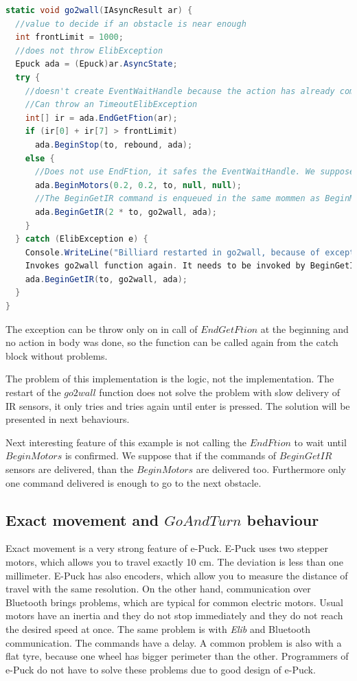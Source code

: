 \begin{lstlisting}[language=cs]
static void go2wall(IAsyncResult ar) {
  //value to decide if an obstacle is near enough
  int frontLimit = 1000;  
  //does not throw ElibException
  Epuck ada = (Epuck)ar.AsyncState;
  try {
    //doesn't create EventWaitHandle because the action has already completed synchronously.
    //Can throw an TimeoutElibException
    int[] ir = ada.EndGetFtion(ar);    
    if (ir[0] + ir[7] > frontLimit)
      ada.BeginStop(to, rebound, ada);
    else {
      //Does not use EndFtion, it safes the EventWaitHandle. We suppose, that it succeeds now or in next rounds.
      ada.BeginMotors(0.2, 0.2, to, null, null);
      //The BeginGetIR command is enqueued in the same mommen as BeginMotors, therefor 2*to.
      ada.BeginGetIR(2 * to, go2wall, ada);
    }
  } catch (ElibException e) {
    Console.WriteLine("Billiard restarted in go2wall, because of exception:\n" + e.Message);
    Invokes go2wall function again. It needs to be invoked by BeginGetIR command, because it expects ar with IR values.
    ada.BeginGetIR(to, go2wall, ada);
  }
}
\end{lstlisting}
  The exception can be throw only on in call of $EndGetFtion$ at the beginning and 
  no action in body was done, so the function can be called again from the catch block without problems.

  The problem of this implementation is the logic, not the implementation. 
  The restart of the $go2wall$ function does not solve the problem with 
  slow delivery of IR sensors, it only tries and tries again until enter is pressed.
  The solution will be presented in next behaviours.

  Next interesting feature of this example is not calling the $EndFtion$ to wait until $BeginMotors$ is confirmed.
  We suppose that if the commands of $BeginGetIR$ sensors are delivered, than the $BeginMotors$ are delivered too.
  Furthermore only one command delivered is enough to go to the next obstacle.

\subsection{Exact movement and $GoAndTurn$ behaviour} \label{sec:go}
  Exact movement is a very strong feature of e-Puck. E-Puck uses two stepper motors,
  which allows you to travel exactly 10 cm. The deviation is less than one millimeter.
  E-Puck has also encoders, which allow you to measure the distance of travel with the same resolution.
  On the other hand, communication over Bluetooth brings problems, which are typical for common electric motors.
  Usual motors have an inertia and they do not stop immediately and they do not reach the desired speed at once. The same problem is with 
  {\it Elib} and Bluetooth communication. The commands have a delay.
  A common problem is also with a flat tyre, because one wheel has bigger perimeter than the other.
  Programmers of e-Puck do not have to solve these problems due to good design of e-Puck.


